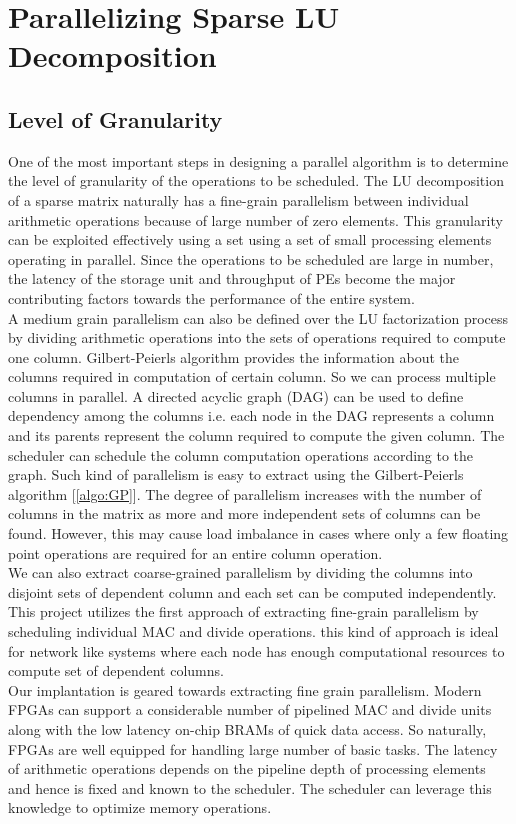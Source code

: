 \chapter{Parallelizing Sparse LU Decomposition}
\label{chapter:parLU}

\section{Level of Granularity}

One of the most important steps in designing a parallel algorithm is to determine the 
level of granularity of the operations to be scheduled.
The LU decomposition of a sparse matrix naturally has a
fine-grain parallelism between individual arithmetic operations because of large 
number of zero elements. This granularity can be exploited effectively using a set 
using a set of small processing elements operating in parallel. Since the operations 
to be scheduled are large in number, the latency of the storage unit and throughput of PEs
become the major contributing factors towards the performance of the entire system.
\\
A medium grain parallelism can also be defined over the LU factorization process by dividing 
arithmetic operations into the sets of operations required to compute one column. 
Gilbert-Peierls algorithm provides the information about the 
columns required in computation of certain column. So we can process 
multiple columns in parallel. 
A directed acyclic graph (DAG) can be used to define dependency among the 
columns i.e. each node in the DAG represents a column and its parents represent the column required to 
compute the given column. The scheduler can schedule the column computation operations according to the graph. 
Such kind of parallelism is easy to extract using the Gilbert-Peierls algorithm [\ref{algo:GP}]. 
The degree of parallelism increases with the number of columns in the matrix as more and more independent 
sets of columns can be found. However, this may cause load imbalance in cases where only 
a few floating point operations are required for an entire column operation.
\\
We can also extract coarse-grained parallelism by dividing the columns
into disjoint sets of dependent column and each set
can be computed independently. This project utilizes the first approach of 
extracting fine-grain parallelism by scheduling individual MAC and divide operations. 
this kind of approach is ideal for network like systems where each node has enough computational
resources to compute set of dependent columns.
\\
Our implantation is geared towards extracting fine grain parallelism. Modern 
FPGAs can support a considerable number of pipelined MAC and divide units along with the 
low latency on-chip BRAMs of quick data access. So naturally, FPGAs are well 
equipped for handling large number of basic tasks. The latency of arithmetic operations
depends on the pipeline depth of processing elements and hence is fixed and known to the scheduler.
The scheduler can leverage this knowledge to optimize memory operations.

